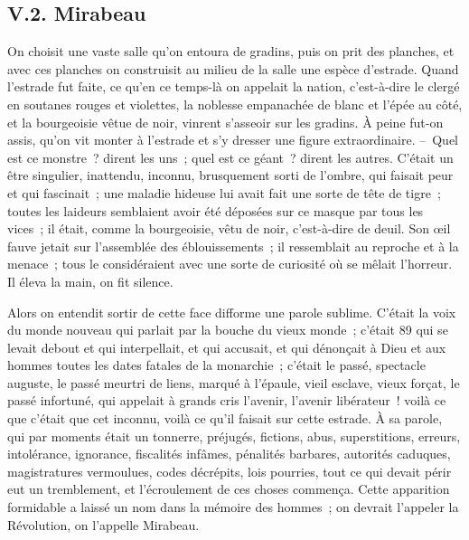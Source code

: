 \documentclass[french,twoside]{book} %
\begin{document}
\subsection[{V.2. Mirabeau}]{V.2. Mirabeau}
\noindent On choisit une vaste salle qu’on entoura de gradins, puis on prit des planches, et avec ces planches on construisit au milieu de la salle une espèce d’estrade. Quand l’estrade fut faite, ce qu’en ce temps-là on appelait la nation, c’est-à-dire le clergé en soutanes rouges et violettes, la noblesse empanachée de blanc et l’épée au côté, et la bourgeoisie vêtue de noir, vinrent s’asseoir sur les gradins. À peine fut-on assis, qu’on vit monter à l’estrade et s’y dresser une figure extraordinaire. – Quel est ce monstre ? dirent les uns ; quel est ce géant ? dirent les autres. C’était un être singulier, inattendu, inconnu, brusquement sorti de l’ombre, qui faisait peur et qui fascinait ; une maladie hideuse lui avait fait une sorte de tête de tigre ; toutes les laideurs semblaient avoir été déposées sur ce masque par tous les vices ; il était, comme la bourgeoisie, vêtu de noir, c’est-à-dire de deuil. Son œil fauve jetait sur l’assemblée des éblouissements ; il ressemblait au reproche et à la menace ; tous le considéraient avec une sorte de curiosité où se mêlait l’horreur. Il éleva la main, on fit silence.\par
Alors on entendit sortir de cette face difforme une parole sublime. C’était la voix du monde nouveau qui parlait par la bouche du vieux monde ; c’était 89 qui se levait debout et qui interpellait, et qui accusait, et qui dénonçait à Dieu et aux hommes toutes les dates fatales de la monarchie ; c’était le passé, spectacle auguste, le passé meurtri de liens, marqué à l’épaule, vieil esclave, vieux forçat, le passé infortuné, qui appelait à grands cris l’avenir, l’avenir libérateur ! voilà ce que c’était que cet inconnu, voilà ce qu’il faisait sur cette estrade. À sa parole, qui par moments était un tonnerre, préjugés, fictions, abus, superstitions, erreurs, intolérance, ignorance, fiscalités infâmes, pénalités barbares, autorités caduques, magistratures vermoulues, codes décrépits, lois pourries, tout ce qui devait périr eut un tremblement, et l’écroulement de ces choses commença. Cette apparition formidable a laissé un nom dans la mémoire des hommes ; on devrait l’appeler la Révolution, on l’appelle Mirabeau.
\end{document}
